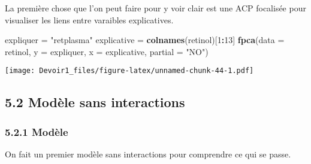 \documentclass[]{article}
\newenvironment{Shaded}{\begin{snugshade}}{\end{snugshade}}
\newcommand{\KeywordTok}[1]{\textcolor[rgb]{0.13,0.29,0.53}{\textbf{#1}}}
\newcommand{\DataTypeTok}[1]{\textcolor[rgb]{0.13,0.29,0.53}{#1}}
\newcommand{\DecValTok}[1]{\textcolor[rgb]{0.00,0.00,0.81}{#1}}
\newcommand{\StringTok}[1]{\textcolor[rgb]{0.31,0.60,0.02}{#1}}
\newcommand{\OperatorTok}[1]{\textcolor[rgb]{0.81,0.36,0.00}{\textbf{#1}}}
\newcommand{\NormalTok}[1]{#1}
\begin{document}
La première chose que l'on peut faire pour y voir clair est une ACP
focalisée pour visualiser les liens entre varaibles explicatives.

\begin{Shaded}
\begin{Highlighting}[]
\NormalTok{expliquer =}\StringTok{ "retplasma"}
\NormalTok{explicative =}\StringTok{ }\KeywordTok{colnames}\NormalTok{(retinol)[}\DecValTok{1}\OperatorTok{:}\DecValTok{13}\NormalTok{]}
\KeywordTok{fpca}\NormalTok{(}\DataTypeTok{data =}\NormalTok{ retinol, }\DataTypeTok{y =}\NormalTok{ expliquer, }\DataTypeTok{x =}\NormalTok{ explicative, }\DataTypeTok{partial =} \StringTok{"NO"}\NormalTok{)}
\end{Highlighting}
\end{Shaded}

\texttt{[image: Devoir1\_files/figure-latex/unnamed-chunk-44-1.pdf]}

\subsection{5.2 Modèle sans
interactions}\label{moduxe8le-sans-interactions}

\subsubsection{5.2.1 Modèle}\label{moduxe8le}

On fait un premier modèle sans interactions pour comprendre ce qui se
passe.

\begin{Shaded}
\end{Shaded}
\end{document}
